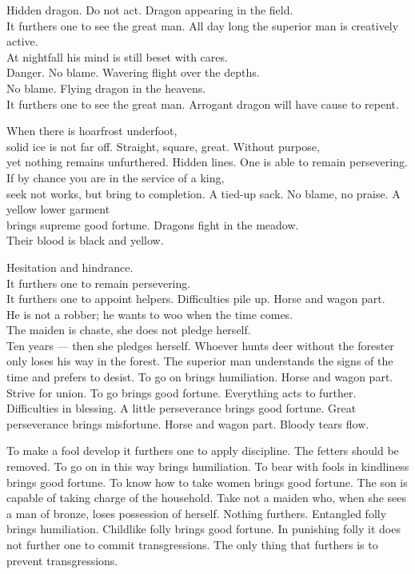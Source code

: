 {Hidden dragon. Do not act.}
{Dragon appearing in the field.\\
 It furthers one to see the great man.}
{All day long the superior man is creatively active.\\
 At nightfall his mind is still beset with cares.\\
 Danger. No blame.}
{Wavering flight over the depths.\\
 No blame.}
{Flying dragon in the heavens.\\
 It furthers one to see the great man.}
{Arrogant dragon will have cause to repent.}

{When there is hoarfrost underfoot,\\
 solid ice is not far off.}
{Straight, square, great. Without purpose,\\
 yet nothing remains unfurthered.}
{Hidden lines. One is able to remain persevering.\\
 If by chance you are in the service of a king,\\
 seek not works, but bring to completion.}
{A tied-up sack. No blame, no praise.}
{A yellow lower garment\\
 brings supreme good fortune.}
{Dragons fight in the meadow.\\
 Their blood is black and yellow.}

{Hesitation and hindrance.\\
 It furthers one to remain persevering.\\
 It furthers one to appoint helpers.}
{Difficulties pile up. Horse and wagon part.\\
 He is not a robber; he wants to woo when the time comes.\\
 The maiden is chaste, she does not pledge herself.\\
 Ten years --- then she pledges herself.}
{Whoever hunts deer without the forester
 only loses his way in the forest.
 The superior man understands the signs of the time
 and prefers to desist.
 To go on brings humiliation.}
{Horse and wagon part.
 Strive for union.
 To go brings good fortune.
 Everything acts to further.}
{Difficulties in blessing.
 A little perseverance brings good fortune.
 Great perseverance brings misfortune.}
{Horse and wagon part.
 Bloody tears flow.}

{To make a fool develop it furthers one to apply discipline.
 The fetters should be removed.
 To go on in this way brings humiliation.}
{To bear with fools in kindliness brings good fortune.
 To know how to take women brings good fortune.
 The son is capable of taking charge of the household.}
{Take not a maiden who, when she sees a man of bronze,
 loses possession of herself. Nothing furthers.}
{Entangled folly brings humiliation.}
{Childlike folly brings good fortune.}
{In punishing folly it does not further one to commit transgressions.
 The only thing that furthers is to prevent transgressions.}

